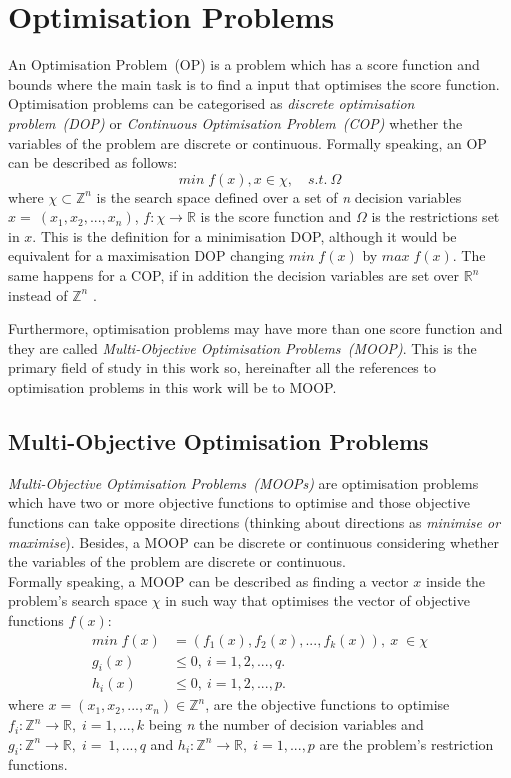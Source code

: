 \section{Optimisation Problems}
An Optimisation Problem~(OP) is a problem which has a score function and bounds where the main task is to find a input that optimises the score function. Optimisation problems can be categorised as \textit{discrete optimisation problem~(DOP)} or \textit{Continuous Optimisation Problem~(COP)} whether the variables of the problem are discrete or continuous. 
Formally speaking, an OP can be described as follows:
\begin{equation*}
min\;f(x), x \in \chi,\quad s.t.\:\Omega
\end{equation*}
where $\chi \subset\mathbb{Z}^{n}$ is the search space defined over a set of \textit{n} decision variables  $x = ~(x_{1}, x_{2},..., x_{n})$, $f: \chi \rightarrow \mathbb{R}$ is the score function and $\Omega$ is the restrictions set in $x$. This is the definition for a minimisation DOP, although it would be equivalent for a maximisation DOP changing $min\;f(x)$ by $max\;f(x)$. The same happens for a COP, if in addition the decision variables are set over $\mathbb{R}^{n}$ instead of $\mathbb{Z}^{n}$ .

Furthermore, optimisation problems may have more than one score function and they are called \textit{Multi-Objective Optimisation Problems~(MOOP)}. This is the primary field of study in this work so, hereinafter all the references to optimisation problems in this work will be to MOOP.
\subsection{Multi-Objective Optimisation Problems}

\textit{Multi-Objective Optimisation Problems~(MOOPs)} are optimisation problems which have two or more objective functions to optimise and those objective functions can take opposite directions (thinking about directions as \textit{minimise or maximise}). Besides, a MOOP can be discrete or continuous considering whether the variables of the problem are discrete or continuous. \\
Formally speaking, a MOOP can be described as finding a vector \textbf{$x$} inside the problem's search space \textit{$\chi$} in such way that optimises the vector of objective functions \textit{$f(x)$}\cite{search}:
\begin{align*}
min\;f(x) & = (f_{1}(x), f_{2}(x), ..., f_{k}(x)), \: x\;\in\chi \\
 g_{i}(x) & \leq 0, \: i = 1, 2, ..., q. \\
 h_{i}(x) & \leq 0, \: i = 1, 2, ..., p.
\end{align*}
where $x = (x_{1}, x_{2}, ..., x_{n}) \in \mathbb{Z}^{n}$, are the objective functions to optimise $f_{i}: \mathbb{Z}^{n} \rightarrow \mathbb{R}, \; i = 1, ..., k$ being \textit{n} the number of decision variables and $g_{i}: \mathbb{Z}^{n} \rightarrow \mathbb{R}, \; i = ~1, ..., q$ and $h_{i}: \mathbb{Z}^{n} \rightarrow \mathbb{R}, \; i = 1, ..., p$ are the problem's restriction functions.

